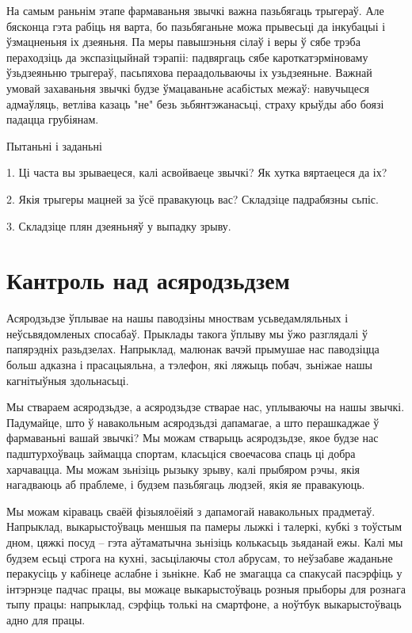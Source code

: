 На самым раньнім этапе фармаваньня звычкі важна пазьбягаць трыгераў. Але бясконца гэта рабіць ня варта, бо пазьбяганьне можа прывесьці да інкубацыі і ўзмацненьня іх дзеяньня. Па меры павышэньня сілаў і веры ў сябе трэба пераходзіць да экспазіцыйнай тэрапіі: падвяргаць сябе кароткатэрміноваму ўзьдзеяньню трыгераў, пасьпяхова пераадольваючы іх узьдзеяньне. Важнай умовай захаваньня звычкі будзе ўмацаваньне асабістых межаў: навучыцеся адмаўляць, ветліва казаць "не" безь зьбянтэжанасьці, страху крыўды або боязі падацца грубіянам.

Пытаньні і заданьні

1. Ці часта вы зрываецеся, калі асвойваеце звычкі? Як хутка вяртаецеся да іх?

2. Якія трыгеры мацней за ўсё правакуюць вас? Складзіце падрабязны сьпіс.

3. Складзіце плян дзеяньняў у выпадку зрыву.


\section{Кантроль над асяродзьдзем}

Асяродзьдзе ўплывае на нашы паводзіны мноствам усьведамляльных і неўсьвядомленых спосабаў. Прыклады такога ўплыву мы ўжо разглядалі ў папярэдніх разьдзелах. Напрыклад, малюнак вачэй прымушае нас паводзіцца больш адказна і прасацыяльна, а тэлефон, які ляжыць побач, зьніжае нашы кагнітыўныя здольнасьці. 

Мы ствараем асяродзьдзе, а асяродзьдзе стварае нас, уплываючы на нашы звычкі. Падумайце, што ў навакольным асяродзьдзі дапамагае, а што перашкаджае ў фармаваньні вашай звычкі? Мы можам стварыць асяродзьдзе, якое будзе нас падштурхоўваць займацца спортам, класьціся своечасова спаць ці добра харчавацца. Мы можам зьнізіць рызыку зрыву, калі прыбяром рэчы, якія нагадваюць аб праблеме, і будзем пазьбягаць людзей, якія яе правакуюць.

Мы можам кіраваць сваёй фізыялоёіяй з дапамогай навакольных прадметаў. Напрыклад, выкарыстоўваць меншыя па памеры лыжкі і талеркі, кубкі з тоўстым дном, цяжкі посуд – гэта аўтаматычна зьнізіць колькасьць зьяданай ежы. Калі мы будзем есьці строга на кухні, засьцілаючы стол абрусам, то неўзабаве жаданьне перакусіць у кабінеце аслабне і зьнікне. Каб не змагацца са спакусай пасэрфіць у інтэрнэце падчас працы, вы можаце выкарыстоўваць розныя прыборы для рознага тыпу працы: напрыклад, сэрфіць толькі на смартфоне, а ноўтбук выкарыстоўваць адно для працы.

